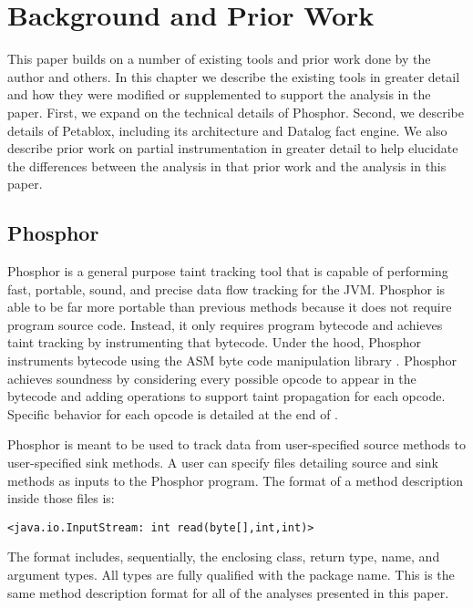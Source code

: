 \chapter{Background and Prior Work}
This paper builds on a number of existing tools and prior work done by the author and others. In this chapter we describe the existing tools in greater detail and how they were modified or supplemented to support the analysis in the paper. First, we expand on the technical details of Phosphor. Second, we describe details of Petablox, including its architecture and Datalog fact engine. We also describe prior work on partial instrumentation in greater detail to help elucidate the differences between the analysis in that prior work and the analysis in this paper.
\section{Phosphor}
Phosphor \cite{phosphor_oopsla} is a general purpose taint tracking tool that is capable of performing fast, portable, sound, and precise data flow tracking for the JVM. Phosphor is able to be far more portable than previous methods because it does not require program source code. Instead, it only requires program bytecode and achieves taint tracking by instrumenting that bytecode. Under the hood, Phosphor instruments bytecode using the ASM byte code manipulation library \cite{bruneton2002asm}. Phosphor achieves soundness by considering every possible opcode to appear in the bytecode and adding operations to support taint propagation for each opcode. Specific behavior for each opcode is detailed at the end of \cite{phosphor_oopsla}.

Phosphor is meant to be used to track data from user-specified source methods to user-specified sink methods. A user can specify files detailing source and sink methods as inputs to the Phosphor program. The format of a method description inside those files is:

\begin{center}
  \texttt{<java.io.InputStream: int read(byte[],int,int)>}
\end{center}

The format includes, sequentially, the enclosing class, return type, name, and argument types. All types are fully qualified with the package name. This is the same method description format for all of the analyses presented in this paper.

